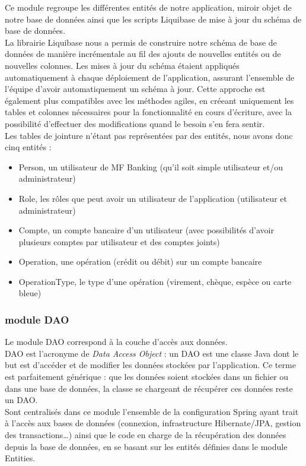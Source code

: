 Ce module regroupe les différentes entités de notre application, miroir objet de notre base de données ainsi que les scripts Liquibase de mise à jour du schéma de base de données.\\
 La librairie Liquibase nous a permis de construire notre schéma de base de données de manière incrémentale  au fil des ajouts de nouvelles entités ou de nouvelles colonnes. Les mises à jour du schéma étaient  appliqués automatiquement à chaque déploiement de l'application, assurant l'ensemble de l'équipe d'avoir automatiquement un schéma à jour.  Cette approche est également plus compatibles avec les méthodes agiles, en créeant uniquement les tables et colonnes nécessaires pour la fonctionnalité en cours d'écriture, avec la possibilité d'effectuer des modifications quand le besoin s'en fera sentir.\\
 Les tables de jointure n'étant pas représentées par des entités, nous avons donc cinq entités :
 \begin{itemize}
 	\item Person, un utilisateur de MF Banking (qu'il soit simple utilisateur et/ou administrateur)
 	\item Role, les rôles que peut avoir un utilisateur de l'application (utilisateur et administrateur)
 	\item Compte, un compte bancaire d'un utilisateur (avec possibilités d'avoir plusieurs comptes par utilisateur et des comptes joints)
 	\item Operation, une opération (crédit ou débit) sur un compte bancaire
 	\item OperationType, le type d'une opération (virement, chèque, espèce ou carte bleue)
\end{itemize}  

\subsubsection*{module DAO}

Le module DAO correspond à la couche d'accès aux données.\\
DAO est l'acronyme de \textit{Data Access Object} : un DAO est une classe Java dont le but est d'accéder et de modifier les données stockées par l'application. Ce terme est parfaitement générique : que les données soient stockées dans un fichier ou dans une base de données, la classe se chargeant de récupérer ces données reste un DAO.\\ 
Sont centralisés dans ce module l'ensemble de  la configuration Spring ayant trait à l'accès aux bases de données (connexion, infrastructure Hibernate/JPA, gestion des transactions\ldots) ainsi que le code en charge de la récupération des données depuis la base de données, en se basant sur les entités définies dans le module Entities.\\

